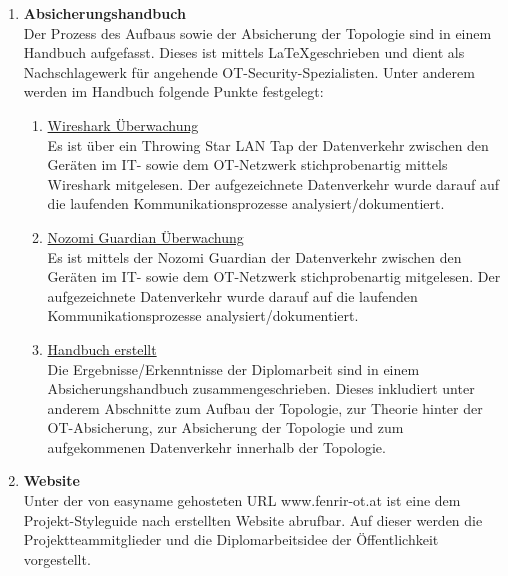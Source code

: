 \documentclass[
	headings=optiontotocandhead,%
	oneside,
	numbers=noenddot,%
	toc=flat, %
	10pt, %
	parskip=full, %
	listof=totoc, %
	listof=flat, %
	numbers=noenddot, %
	bibliography=totoc, %
	a4paper,DIV=14,
]{scrartcl}
\begin{document}
\begin{enumerate}[start=1,label={\bfseries Ziel-H \arabic*},leftmargin=*,wide]
\item{\bfseries{Absicherungshandbuch}}\\
Der Prozess des Aufbaus sowie der Absicherung der Topologie sind in einem Handbuch aufgefasst. Dieses ist mittels \LaTeX geschrieben und dient als Nachschlagewerk für angehende OT-Security-Spezialisten. Unter anderem werden im Handbuch folgende Punkte festgelegt:
\begin{enumerate}[label=\alph*.]
\item{\underline{Wireshark Überwachung}}\\
Es ist über ein Throwing Star LAN Tap der Datenverkehr zwischen den Geräten im IT- sowie dem OT-Netzwerk stichprobenartig mittels Wireshark mitgelesen. Der aufgezeichnete Datenverkehr wurde darauf auf die laufenden Kommunikationsprozesse analysiert/dokumentiert.

\item{\underline{Nozomi Guardian Überwachung}}\\
Es ist mittels der Nozomi Guardian der Datenverkehr zwischen den Geräten im IT- sowie dem OT-Netzwerk stichprobenartig mitgelesen. Der aufgezeichnete Datenverkehr wurde darauf auf die laufenden Kommunikationsprozesse analysiert/dokumentiert.

\item{\underline{Handbuch erstellt}}\\
Die Ergebnisse/Erkenntnisse der Diplomarbeit sind in einem Absicherungshandbuch zusammengeschrieben. Dieses inkludiert unter anderem Abschnitte zum Aufbau der Topologie, zur Theorie hinter der OT-Absicherung, zur Absicherung der Topologie und zum aufgekommenen Datenverkehr innerhalb der Topologie.
\end{enumerate}

\item{\bfseries{Website}}\\
Unter der von easyname gehosteten URL www.fenrir-ot.at ist eine dem Projekt-Styleguide nach erstellten Website abrufbar. Auf dieser werden die Projektteammitglieder und die Diplomarbeitsidee der Öffentlichkeit vorgestellt.
\end{enumerate}
\end{document}

